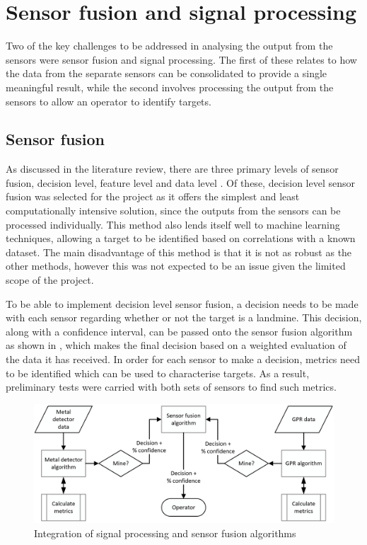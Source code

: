 \documentclass[main.tex]{subfiles}
\begin{document}
\section{Sensor fusion and signal processing}
Two of the key challenges to be addressed in analysing the output from the sensors were sensor fusion and signal processing. The first of these relates to how the data from the separate sensors can be consolidated to provide a single meaningful result, while the second involves processing the output from the sensors to allow an operator to identify targets. 

\subsection{Sensor fusion}
As discussed in the literature review, there are three primary levels of sensor fusion, decision level, feature level and data level \parencite{Yarovoy2009}. Of these, decision level sensor fusion was selected for the project as it offers the simplest and least computationally intensive solution, since the outputs from the sensors can be processed individually. This method also lends itself well to machine learning techniques, allowing a target to be identified based on correlations with a known dataset. The main disadvantage of this method is that it is not as robust as the other methods, however this was not expected to be an issue given the limited scope of the project. 

To be able to implement decision level sensor fusion, a decision needs to be made with each sensor regarding whether or not the target is a landmine. This decision, along with a confidence interval, can be passed onto the sensor fusion algorithm as shown in , which makes the final decision based on a weighted evaluation of the data it has received. In order for each sensor to make a decision, metrics need to be identified which can be used to characterise targets. As a result, preliminary tests were carried with both sets of sensors to find such metrics.

\begin{figure}[ht]
\includegraphics[width=\textwidth]{3-ConceptDesign/fusion.PNG}
\centering
\caption{Integration of signal processing and sensor fusion algorithms} 
\end{figure}
\end{document}
